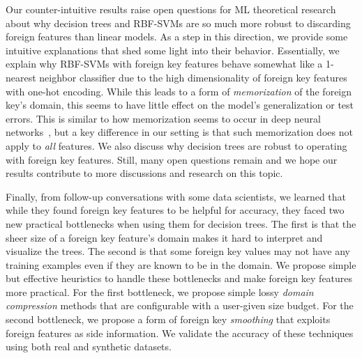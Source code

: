 Our counter-intuitive results raise open questions for ML theoretical research about why decision trees and RBF-SVMs are so much more robust to discarding foreign features
than linear models. As a step in this direction, we provide some intuitive explanations that shed some light into their behavior. 
Essentially, we explain why RBF-SVMs with foreign key features behave somewhat like a 1-nearest neighbor classifier due to the high dimensionality of foreign key features with 
one-hot encoding. While this leads to a form of \textit{memorization} of the foreign key's domain, this seems to have little effect on the model's generalization or test errors.
This is similar to how memorization seems to occur in deep neural networks~\cite{rechtdnn}, but a key difference in our setting is that such memorization does not apply to
\textit{all} features. We also discuss why decision trees are robust to operating with foreign key features. 
Still, many open questions remain and we hope our results contribute to more discussions and research on this topic.


Finally, from follow-up conversations with some data scientists, we learned that while they found foreign key features to be helpful for accuracy, they faced two new practical 
bottlenecks when using them for decision trees. The first is that the sheer size of a foreign key feature's domain makes it hard to interpret and visualize the trees. 
The second is that some foreign key values may not have any training examples even if they are known to be in the domain. 
We propose simple but effective heuristics to handle these bottlenecks and make foreign key features more practical. For the first bottleneck, we propose simple lossy 
\textit{domain compression} methods that are configurable with a user-given size budget. For the second bottleneck, we propose a form of foreign key \textit{smoothing} 
that exploits foreign features as side information. We validate the accuracy of these techniques using both real and synthetic datasets.

